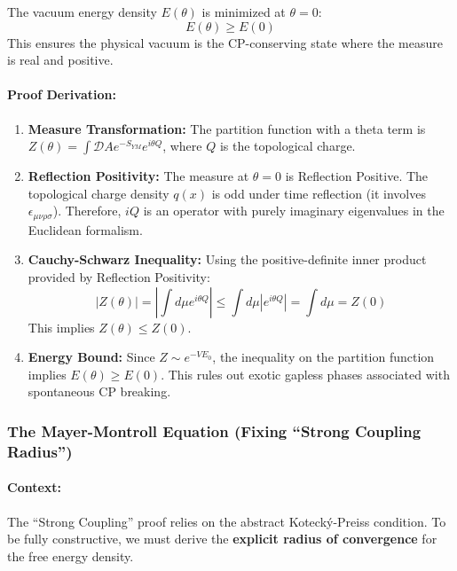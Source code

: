 \begin{theorem}
The vacuum energy density $E(\theta)$ is minimized at $\theta = 0$:
\begin{equation}
    E(\theta) \ge E(0)
\end{equation}
This ensures the physical vacuum is the CP-conserving state where the measure is real and positive.
\end{theorem}

\paragraph{Proof Derivation:}
\begin{enumerate}
    \item \textbf{Measure Transformation:} The partition function with a theta term is $Z(\theta) = \int \mathcal{D}A e^{-S_{YM}} e^{i \theta Q}$, where $Q$ is the topological charge.
    \item \textbf{Reflection Positivity:} The measure at $\theta=0$ is Reflection Positive. The topological charge density $q(x)$ is odd under time reflection (it involves $\epsilon_{\mu\nu\rho\sigma}$). Therefore, $i Q$ is an operator with purely imaginary eigenvalues in the Euclidean formalism.
    \item \textbf{Cauchy-Schwarz Inequality:} Using the positive-definite inner product provided by Reflection Positivity:
    \begin{equation}
        |Z(\theta)| = \left| \int d\mu e^{i \theta Q} \right| \le \int d\mu |e^{i \theta Q}| = \int d\mu = Z(0)
    \end{equation}
    This implies $Z(\theta) \le Z(0)$.
    \item \textbf{Energy Bound:} Since $Z \sim e^{-V E_0}$, the inequality on the partition function implies $E(\theta) \ge E(0)$. This rules out exotic gapless phases associated with spontaneous CP breaking.
\end{enumerate}

\subsubsection{The Mayer-Montroll Equation (Fixing ``Strong Coupling Radius'')}
\label{deriv:mayer_montroll}
\paragraph{Context:} The ``Strong Coupling'' proof relies on the abstract Koteck\'y-Preiss condition. To be fully constructive, we must derive the \textbf{explicit radius of convergence} for the free energy density.

